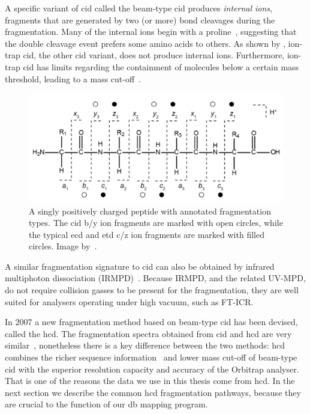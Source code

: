 A specific variant of \gls*{cid} called the beam-type \gls*{cid} produces \emph{internal ions}, fragments that are generated by two (or more) bond cleavages during the fragmentation. Many of the internal ions begin with a proline~\cite{michalski2012systematic}, suggesting that the double cleavage event prefers some amino acids to others. As shown by \citet{michalski2012systematic}, ion-trap \gls*{cid}, the other \gls*{cid} variant, does not produce internal ions. Furthermore, ion-trap \gls*{cid} has limits regarding the containment of molecules below a certain mass threshold, leading to a mass cut-off~\cite{louris1987instrumentation}.

\begin{figure}
  \centering
  \includegraphics[width=.75\linewidth]{img/fragment-types.png}
  \caption{A singly positively charged peptide with annotated fragmentation types. The \gls*{cid} b/y ion fragments are marked with open circles, while the typical \gls*{ecd} and \gls*{etd} c/z ion fragments are marked with filled circles. Image by~\citet{hart2014review}.}\label{fig:fragment-types}
\end{figure}

A similar fragmentation signature to \gls*{cid} can also be obtained by infrared multiphoton dissociation (IRMPD)~\cite{oomens2006gas}. Because IRMPD, and the related UV-MPD, do not require collision gasses to be present for the fragmentation, they are well suited for analysers operating under high vacuum, such as FT-ICR\@.

In 2007 a new fragmentation method based on beam-type \gls*{cid} has been devised, called the \gls*{hcd}\@. The fragmentation spectra obtained from \gls*{cid} and \gls*{hcd} are very similar~\cite{michalski2012systematic}, nonetheless there is a key difference between the two methods: \gls*{hcd} combines the richer sequence information~\cite{xia2006ion} and lower mass cut-off of beam-type \gls*{cid} with the superior resolution capacity and accuracy of the Orbitrap analyser. That is one of the reasons the data we use in this thesis come from \gls*{hcd}\@. In the next section we describe the common \gls*{hcd} fragmentation pathways, because they are crucial to the function of our \gls*{db} mapping program.

